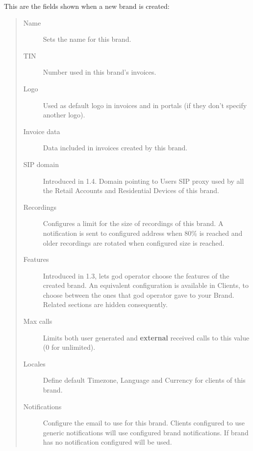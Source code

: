 \documentclass[letterpaper,10pt,english]{sphinxmanual}
\begin{document}
This are the fields shown when a new brand is created:
\begin{quote}
\begin{description}
\item[{Name}] \leavevmode
Sets the name for this brand.

\item[{TIN}] \leavevmode
Number used in this brand's invoices.

\item[{Logo}] \leavevmode
Used as default logo in invoices and in portals (if they don't specify
another logo).

\item[{Invoice data}] \leavevmode
Data included in invoices created by this brand.

\item[{SIP domain}] \leavevmode
Introduced in 1.4. Domain pointing to Users SIP proxy used by all the
Retail Accounts and Residential Devices of this brand.

\item[{Recordings}] \leavevmode
Configures a limit for the size of recordings of this brand. A
notification is sent to configured address when 80\% is reached and
older recordings are rotated when configured size is reached.

\item[{Features}] \leavevmode
Introduced in 1.3, lets god operator choose the features of the created
brand. An equivalent configuration is available in Clients, to choose
between the ones that god operator gave to your Brand. Related sections
are hidden consequently.

\item[{Max calls}] \leavevmode
Limits both user generated and \textbf{external} received calls to this value
(0 for unlimited).

\item[{Locales}] \leavevmode
Define default Timezone, Language and Currency for clients of this brand.

\item[{Notifications}] \leavevmode
Configure the email {\hyperref[administration_portal/brand/settings/notification_templates:id1]{}} to use for this brand.
Clients configured to use generic notifications will use configured
brand notifications. If brand has no notification configured
{\hyperref[administration_portal/platform/default_notification_templates:id1]{}} will be used.


\end{description}
\end{quote}
\end{document}
